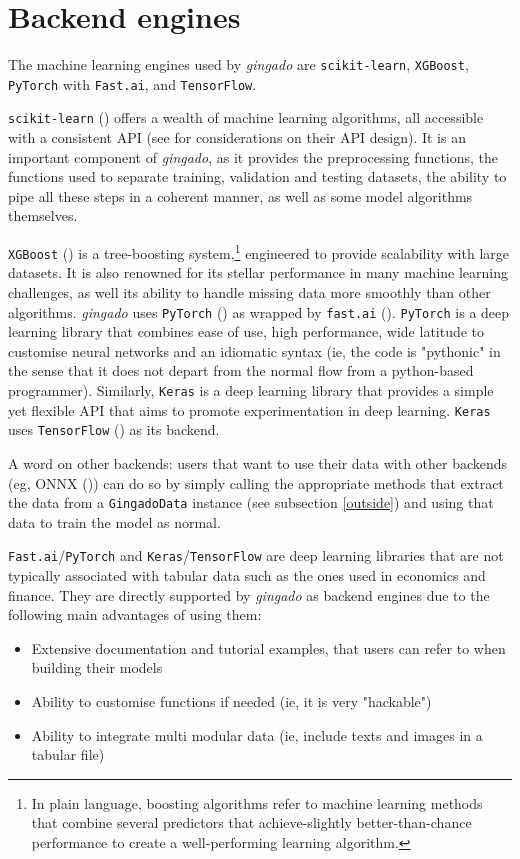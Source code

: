 \documentclass{article}
\begin{document}
\section{Backend engines}\label{backends}

The machine learning engines used by \textit{gingado} are \texttt{scikit-learn}, \texttt{XGBoost}, \texttt{PyTorch} with \texttt{Fast.ai}, and \texttt{TensorFlow}.


\texttt{scikit-learn} (\cite{scikit-learn}) offers a wealth of machine learning algorithms, all accessible with a consistent API (see \cite{sklearn_api} for considerations on their API design). It is an important component of \textit{gingado}, as it provides the preprocessing functions, the functions used to separate training, validation and testing datasets, the ability to pipe all these steps in a coherent manner, as well as some model algorithms themselves.



\texttt{XGBoost} (\cite{xgboost}) is a tree-boosting system,\footnote{In plain language, boosting algorithms refer to machine learning methods that combine several predictors that achieve-slightly better-than-chance performance to create a well-performing learning algorithm.} engineered to provide scalability with large datasets. It is also renowned for its stellar performance in many machine learning challenges, as well its ability to handle missing data more smoothly than other algorithms. \textit{gingado} uses \texttt{PyTorch} (\cite{PyTorch}) as wrapped by \texttt{fast.ai} (\cite{fastai}). \texttt{PyTorch} is a deep learning library that combines ease of use, high performance, wide latitude to customise neural networks and an idiomatic syntax (ie, the code is "pythonic" in the sense that it does not depart from the normal flow from a python-based programmer). Similarly, \texttt{Keras} is a deep learning library that provides a simple yet flexible API that aims to promote experimentation in deep learning. \texttt{Keras} uses \texttt{TensorFlow} (\cite{tensorflow2015-whitepaper}) as its backend.

A word on other backends: users that want to use their data with other backends (eg, ONNX (\cite{onnx})) can do so by simply calling the appropriate methods that extract the data from a \texttt{GingadoData} instance (see subsection \ref{outside}) and using that data to train the model as normal.

\texttt{Fast.ai}/\texttt{PyTorch} and \texttt{Keras}/\texttt{TensorFlow} are deep learning libraries that are not typically associated with tabular data such as the ones used in economics and finance. They are directly supported by \textit{gingado} as backend engines due to the following main advantages of using them:
\begin{itemize}
    \item Extensive documentation and tutorial examples, that users can refer to when building their models
    \item Ability to customise functions if needed (ie, it is very "hackable")
    \item Ability to integrate multi modular data (ie, include texts and images in a tabular file)
\end{itemize}
\end{document}
